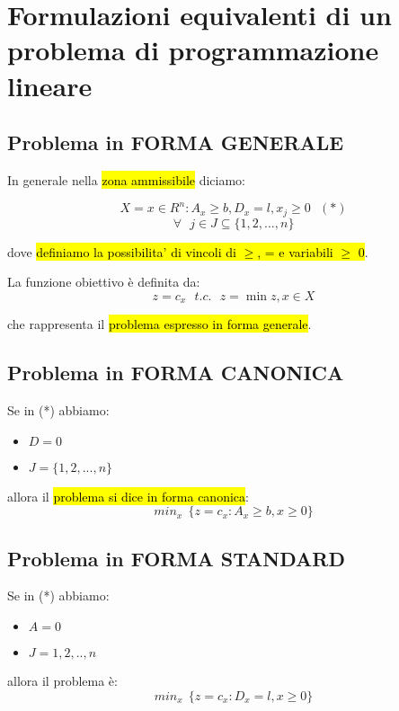 \newpage
\section{Formulazioni equivalenti di un problema di programmazione lineare}


\subsection{Problema in FORMA GENERALE}

In generale nella \hl{zona ammissibile} diciamo:

$$X={x \in R^n : A_x \geq b, D_x = l, x_j \geq 0}\ \ \ (*)$$
$$\forall\ \ \ j \in J \subseteq \{1,2,...,n\}$$

dove \hl{definiamo la possibilita' di vincoli di $\geq$, = e variabili $\geq$ 0}.

La funzione obiettivo è definita da: $$z = c_x\ \ \ t.c.\ \ \ z = \min z, x \in X$$

che rappresenta il \hl{problema espresso in forma generale}.


\subsection{Problema in FORMA CANONICA}

Se in (*) abbiamo:

\begin{itemize}
	\item $D = 0$
	\item $J = \{1,2,...,n\}$
\end{itemize}

allora il \hl{problema si dice in forma canonica}: $$min_x\ \ \{z = c_x : A_x \geq b, x \geq 0\}$$


\subsection{Problema in FORMA STANDARD}

Se in (*) abbiamo:

\begin{itemize}
	\item $A = 0$
	\item $J = {1,2,..,n}$
\end{itemize}

allora il problema è: $$min_x\ \ \{z = c_x: D_x = l, x \geq 0\}$$

